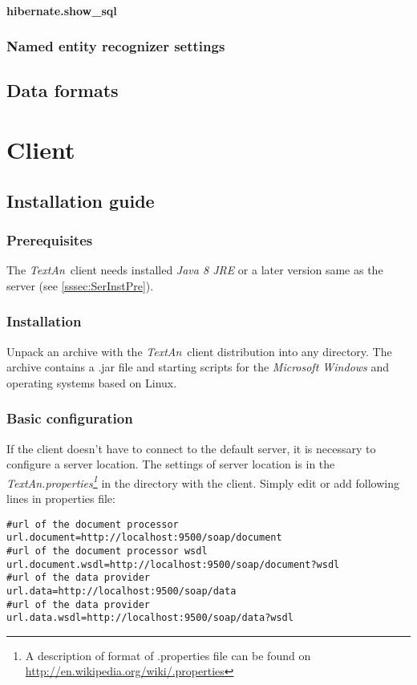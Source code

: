 \documentclass[12pt,a4paper]{report}
\newcommand{\textan}{\emph{TextAn}}
\begin{document}
\paragraph{hibernate.show\_sql}

\subsubsection{Named entity recognizer settings}

\subsection{Data formats}

\section{Client}

\subsection{Installation guide}

\subsubsection{Prerequisites}

The \textan\ client needs installed \emph{Java 8 JRE} or a later version same as the server (see \ref{sssec:SerInstPre}).

\subsubsection{Installation}

Unpack an archive with the \textan\ client distribution into any directory. The archive contains a .jar file and starting scripts for the \emph{Microsoft Windows} and operating systems based on Linux.

\subsubsection{Basic configuration}

If the client doesn't have to connect to the default server, it is necessary to configure a server location. The settings of server location is in the \emph{TextAn.properties\footnote{A description of format of .properties file can be found on \url{http://en.wikipedia.org/wiki/.properties}}} in the directory with the client. Simply edit or add following lines in properties file:
\begin{lstlisting}[frame=single,language=properties]
#url of the document processor
url.document=http://localhost:9500/soap/document
#url of the document processor wsdl
url.document.wsdl=http://localhost:9500/soap/document?wsdl
#url of the data provider
url.data=http://localhost:9500/soap/data
#url of the data provider
url.data.wsdl=http://localhost:9500/soap/data?wsdl
\end{lstlisting}
\end{document}
